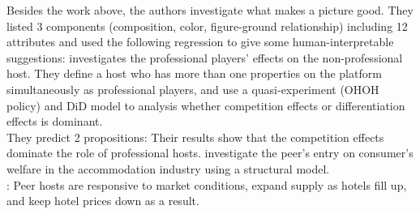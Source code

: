 \documentclass[12pt]{report}
\begin{document}
Besides the work above, the authors investigate what makes a picture good. They listed 3 components (composition, color, figure-ground relationship) including 12 attributes and used the
following regression to give some human-interpretable suggestions:
\cite{chen2023regulating} investigates the professional players' effects on the non-professional host. They define a host who has more than
one properties on the platform simultaneously as professional players, and use a quasi-experiment (OHOH policy) and DiD model to analysis
whether competition effects or differentiation effects is dominant.\\
They predict 2 propositions:
Their results show that the competition effects dominate the role of professional hosts.
\cite{farronato2022welfare} investigate the peer's entry on consumer's welfare in the accommodation industry using a structural model.\\
: Peer hosts are responsive to market conditions, expand supply as hotels fill up, and keep hotel prices down as a result.
\end{document}

